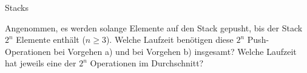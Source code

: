 \documentclass[11pt,a4paper]{article}
\begin{document}
\begin{aufgabe}{5}{Stacks}
\begin{enumerate}
        Angenommen, es werden solange Elemente auf den Stack gepusht, bis der Stack $2^n$ Elemente enthält ($n \geq 3$).
        Welche Laufzeit benötigen diese $2^n$ Push-Operationen bei Vorgehen a) und bei Vorgehen b) insgesamt?
        Welche Laufzeit hat jeweils eine der $2^n$ Operationen im Durchschnitt?
    \end{enumerate}
\end{aufgabe}
\end{document}
